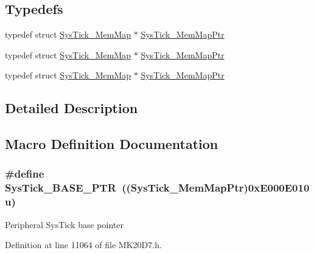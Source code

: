 \subsection*{Typedefs}
\begin{DoxyCompactItemize}
\item 
typedef struct \hyperlink{struct_sys_tick___mem_map}{Sys\+Tick\+\_\+\+Mem\+Map} $\ast$ \hyperlink{group___sys_tick___peripheral_ga19e2a0c9400dcdfd462a92ca83cff253}{Sys\+Tick\+\_\+\+Mem\+Map\+Ptr}
\item 
typedef struct \hyperlink{struct_sys_tick___mem_map}{Sys\+Tick\+\_\+\+Mem\+Map} $\ast$ \hyperlink{group___sys_tick___peripheral_ga19e2a0c9400dcdfd462a92ca83cff253}{Sys\+Tick\+\_\+\+Mem\+Map\+Ptr}
\item 
typedef struct \hyperlink{struct_sys_tick___mem_map}{Sys\+Tick\+\_\+\+Mem\+Map} $\ast$ \hyperlink{group___sys_tick___peripheral_ga19e2a0c9400dcdfd462a92ca83cff253}{Sys\+Tick\+\_\+\+Mem\+Map\+Ptr}
\end{DoxyCompactItemize}


\subsection{Detailed Description}


\subsection{Macro Definition Documentation}
\subsubsection[{\texorpdfstring{Sys\+Tick\+\_\+\+B\+A\+S\+E\+\_\+\+P\+TR}{SysTick_BASE_PTR}}]{\setlength{\rightskip}{0pt plus 5cm}\#define Sys\+Tick\+\_\+\+B\+A\+S\+E\+\_\+\+P\+TR~(({\bf Sys\+Tick\+\_\+\+Mem\+Map\+Ptr})0x\+E000\+E010u)}\hypertarget{group___sys_tick___peripheral_gaeef73642fdef722ce658e468dad877ea}{}\label{group___sys_tick___peripheral_gaeef73642fdef722ce658e468dad877ea}
Peripheral Sys\+Tick base pointer 

Definition at line 11064 of file M\+K20\+D7.\+h.

